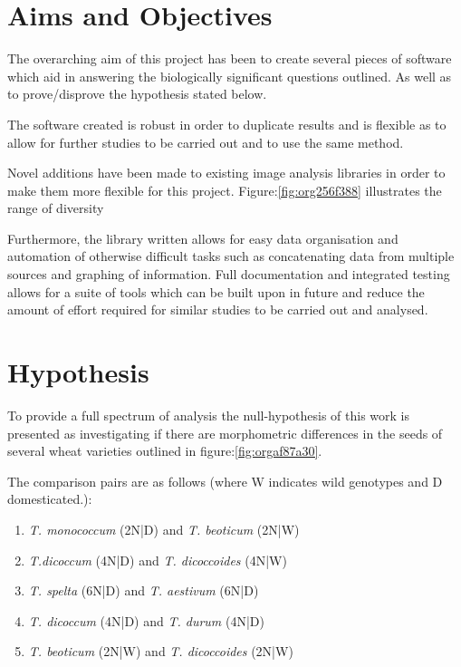 \documentclass[11pt]{report}
\begin{document}
\section{Aims and Objectives}
\label{sec:orgc9522d7}

The overarching aim of this project has been to create several pieces of software which aid in answering the biologically significant questions outlined. As well as to prove/disprove the hypothesis stated below.

The software created is robust in order to duplicate results and is flexible as to allow for further studies to be carried out and to use the same method.

Novel additions have been made to existing image analysis libraries in order to make them more flexible for this project. Figure:\ref{fig:org256f388} illustrates the range of diversity

Furthermore, the library written allows for easy data organisation and automation of otherwise difficult tasks such as concatenating data from multiple sources and graphing of information. Full documentation and integrated testing allows for a suite of tools which can be built upon in future and reduce the amount of effort required for similar studies to be carried out and analysed.

\section{Hypothesis}
\label{sec:org993cb26}
To provide a full spectrum of analysis the null-hypothesis of this work is presented as investigating if there are morphometric differences in the seeds of several wheat varieties outlined in figure:\ref{fig:orgaf87a30}.

The comparison pairs are as follows (where W indicates wild genotypes and D domesticated.):

\begin{enumerate}
\item \emph{T. monococcum} (2N|D) and \emph{T. beoticum} (2N|W)
\item \emph{T.dicoccum} (4N|D) and \emph{T. dicoccoides} (4N|W)
\item \emph{T. spelta} (6N|D) and \emph{T. aestivum} (6N|D)
\item \emph{T. dicoccum} (4N|D) and \emph{T. durum} (4N|D)
\item \emph{T. beoticum} (2N|W) and \emph{T. dicoccoides} (2N|W)
\end{enumerate}
\end{document}
